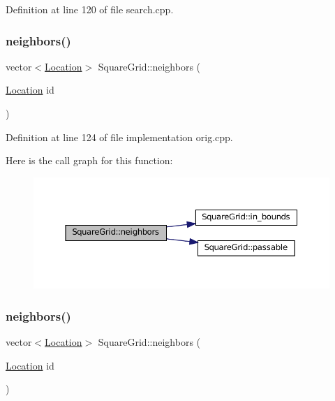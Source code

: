 Definition at line 120 of file search.\+cpp.

\mbox{\label{struct_square_grid_a106d76702d8c4acb03883c477db28e3a}} 
\subsubsection{\texorpdfstring{neighbors()}{neighbors()}\hspace{0.1cm}{\footnotesize\ttfamily [1/2]}}
{\footnotesize\ttfamily vector$<$\mbox{\hyperlink{struct_square_grid_a2c9a2cbd3912aa48ac97289abc3f1c0f}{Location}}$>$ Square\+Grid\+::neighbors (\begin{DoxyParamCaption}\item[{\mbox{\hyperlink{struct_square_grid_a2c9a2cbd3912aa48ac97289abc3f1c0f}{Location}}}]{id }\end{DoxyParamCaption})\hspace{0.3cm}{\ttfamily [inline]}}



Definition at line 124 of file implementation orig.\+cpp.

Here is the call graph for this function\+:
\nopagebreak
\begin{figure}[H]
\begin{center}
\leavevmode
\includegraphics[width=350pt]{struct_square_grid_a106d76702d8c4acb03883c477db28e3a_cgraph}
\end{center}
\end{figure}
\mbox{\label{struct_square_grid_a106d76702d8c4acb03883c477db28e3a}} 
\subsubsection{\texorpdfstring{neighbors()}{neighbors()}\hspace{0.1cm}{\footnotesize\ttfamily [2/2]}}
{\footnotesize\ttfamily vector$<$\mbox{\hyperlink{struct_square_grid_a2c9a2cbd3912aa48ac97289abc3f1c0f}{Location}}$>$ Square\+Grid\+::neighbors (\begin{DoxyParamCaption}\item[{\mbox{\hyperlink{struct_square_grid_a2c9a2cbd3912aa48ac97289abc3f1c0f}{Location}}}]{id }\end{DoxyParamCaption})\hspace{0.3cm}{\ttfamily [inline]}}



